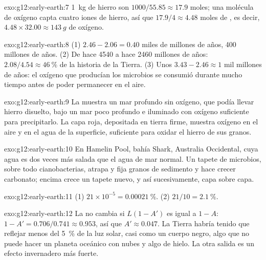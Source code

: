 \begin{solution}{exo:g12:early-earth:7}
\qty{1}{kg} de hierro son $1000/55.85 \approx 17.9$ moles; una molécula de
oxígeno capta cuatro iones de hierro, así que $17.9/4 \approx 4.48$ moles de
, es decir, $4.48 \times 32.00 \approx \qty{143}{g}$ de oxígeno.
\end{solution}

\begin{solution}{exo:g12:early-earth:8}
(1) $2.46 - 2.06 = 0.40$ miles de millones de años, 400 millones de años.
(2) De hace 4540 a hace 2460 millones de años: $2.08/4.54 \approx \qty{46}{\percent}$ de la historia de la Tierra. (3) Unos $3.43 - 2.46 \approx 1$ mil millones de años: el oxígeno que producían los microbios se
consumió durante mucho tiempo antes de poder permanecer en el aire.
\end{solution}

\begin{solution}{exo:g12:early-earth:9}
La  muestra un mar profundo sin oxígeno, que podía
llevar hierro disuelto, bajo un mar poco profundo e iluminado con oxígeno
suficiente para precipitarlo. La capa roja, depositada en tierra firme,
muestra oxígeno en el aire y en el agua de la superficie, suficiente para
oxidar el hierro de sus granos.
\end{solution}

\begin{solution}{exo:g12:early-earth:10}
En Hamelin Pool, bahía Shark, Australia Occidental, cuya agua es dos veces más
salada que el agua de mar normal. Un tapete de microbios, sobre todo
cianobacterias, atrapa y fija granos de sedimento y hace crecer carbonato;
encima crece un tapete nuevo, y así sucesivamente, capa sobre capa.
\end{solution}

\begin{solution}{exo:g12:early-earth:11}
(1) $21 \times 10^{-5} = \qty{0.00021}{\percent}$. (2) $21/10 =
\qty{2.1}{\percent}$.
\end{solution}

\begin{solution}{exo:g12:early-earth:12}
La  no cambia si $L(1 - A')$ es igual a $1 - A$:
$1 - A' = 0.706/0.741 \approx 0.953$, así que $A' \approx 0.047$. La Tierra
habría tenido que reflejar menos del \qty{5}{\percent} de la luz solar, casi
como un cuerpo negro, algo que no puede hacer un planeta oceánico con nubes y
algo de hielo. La otra salida es un efecto invernadero más fuerte.
\end{solution}

